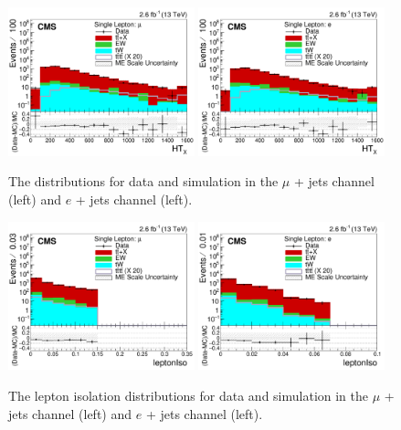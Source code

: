 \begin{figure}[ht!]
    \includegraphics[width=0.48\textwidth]{images/Run2/HTX_StackLogY.pdf}
    \includegraphics[width=0.48\textwidth]{images/Run2/HTX_StackLogY_e.pdf}
    \caption{The \HTX distributions for data and simulation in the $\mu$ + jets channel (left) and $e$ + jets channel (left).}
    \label{fig:HTX}
\end{figure} 

\begin{figure}
    \includegraphics[width=0.48\textwidth]{images/Run2/leptonIso_StackLogY.pdf}
    \includegraphics[width=0.48\textwidth]{images/Run2/leptonIso_StackLogY_e.pdf}
    \caption{The lepton isolation distributions for data and simulation in the $\mu$ + jets channel (left) and $e$ + jets channel (left).}
    \label{fig:lepiso}
\end{figure}
\pagebreak

